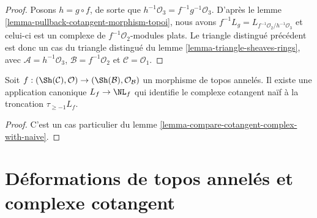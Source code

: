 \begin{proof}
Posons $h = g \circ f$, de sorte que
$h^{-1}\mathcal{O}_3 = f^{-1}g^{-1}\mathcal{O}_3$. D'après le lemme
\ref{lemma-pullback-cotangent-morphism-topoi}, nous avons
$f^{-1}L_g = L_{f^{-1}\mathcal{O}_2/h^{-1}\mathcal{O}_3}$
et celui-ci est un complexe de $f^{-1}\mathcal{O}_2$-modules plats. Le triangle
distingué précédent est donc un cas du triangle distingué du lemme
\ref{lemma-triangle-sheaves-rings}, avec
$\mathcal{A} = h^{-1}\mathcal{O}_3$, $\mathcal{B} = f^{-1}\mathcal{O}_2$ et
$\mathcal{C} = \mathcal{O}_1$.
\end{proof}

\begin{lemma}
\label{lemma-compare-cotangent-complex-with-naive-ringed-topoi}
Soit $f : (\Sh(\mathcal{C}), \mathcal{O}) \to
(\Sh(\mathcal{B}), \mathcal{O}_\mathcal{B})$ un morphisme de topos annelés. Il
existe une application canonique $L_f \to \NL_f$ qui identifie le complexe
cotangent naïf à la troncation $\tau_{\geq -1}L_f$.
\end{lemma}

\begin{proof}
C'est un cas particulier du lemme
\ref{lemma-compare-cotangent-complex-with-naive}.
\end{proof}








\section{Déformations de topos annelés et complexe cotangent}
\label{section-deformations-ringed-topoi}

